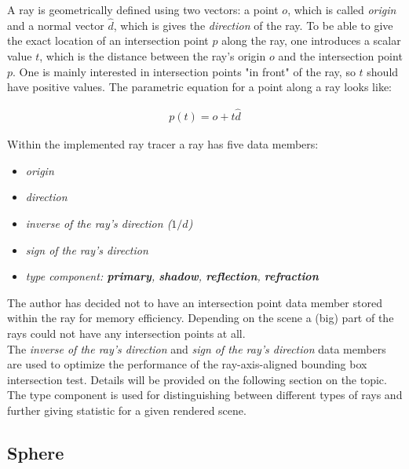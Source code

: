 \documentclass{article}
\begin{document}
A ray is geometrically defined using two vectors: a point $o$, which is called \textit{origin} and a normal vector $\hat{d}$, which is gives the \textit{direction} of the ray. To be able to give the exact location of an intersection point $p$ along the ray, one introduces a scalar value $t$, which is the distance between the ray's origin $o$ and the intersection point $p$. One is mainly interested in intersection points "in front" of the ray, so $t$ should have positive values. The parametric equation for a point along a ray looks like: \cite{rftgu}

\begin{align}
	p(t) = o + t\hat{d}
\end{align}

Within the implemented ray tracer a ray has five data members: 
\begin{itemize}
	\itemsep0em 	%
	\item \textit{origin}
	\item \textit{direction}
	\item \textit{inverse of the ray's direction ($1 / \hat{d}$)}
	\item \textit{sign of the ray's direction}
	\item \textit{type component: \textbf{primary}, \textbf{shadow}, \textbf{reflection}, \textbf{refraction}}
\end{itemize}

\vspace*{\baselineskip}

The author has decided not to have an intersection point data member stored within the ray for memory efficiency. Depending on the scene a (big) part of the rays could not have any intersection points at all. \\
The \textit{inverse of the ray's direction} and \textit{sign of the ray's direction} data members are used to optimize the performance of the ray-axis-aligned bounding box intersection test. Details will be provided on the following section on the topic.\\
The type component is used for distinguishing between different types of rays and further giving statistic for a given rendered scene.

\subsection{Sphere}
\end{document}
